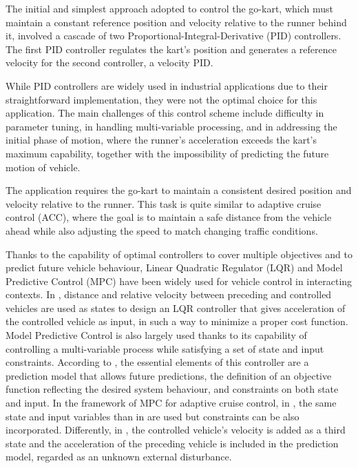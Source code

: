 \documentclass[a4paper,12pt,oneside]{book}
\begin{document}
\bigskip
The initial and simplest approach adopted to control the go-kart, which must maintain a constant reference position and velocity relative to the runner behind it, involved a cascade of two Proportional-Integral-Derivative (PID) controllers.
The first PID controller regulates the kart's position and generates a reference velocity for the second controller, a velocity PID.

While PID controllers are widely used in industrial applications due to their straightforward implementation, they were not the optimal choice for this application.
The main challenges of this control scheme include difficulty in parameter tuning, in handling multi-variable processing, and in addressing the initial phase of motion, where the runner's acceleration exceeds the kart's maximum capability, together with the impossibility of predicting the future motion of vehicle. 

\bigskip
The application requires the go-kart to maintain a consistent desired position and velocity relative to the runner.
This task is quite similar to adaptive cruise control (ACC), where the goal is to maintain a safe distance from the vehicle ahead while also adjusting the speed to match changing traffic conditions.

\bigskip
Thanks to the capability of optimal controllers to cover multiple objectives and to predict future vehicle behaviour, Linear Quadratic Regulator (LQR) and Model Predictive Control (MPC) have been widely used for vehicle control in interacting contexts.
In \cite{LQR_acc}, distance and relative velocity between preceding and controlled vehicles are used as states to design an LQR controller that gives acceleration of the controlled vehicle as input, in such a way to minimize a proper cost function.
Model Predictive Control is also largely used thanks to its capability of controlling a multi-variable process while satisfying a set of state and input constraints. 
According to \cite{MPC_basics}, the essential elements of this controller are a prediction model that allows future predictions, the definition of an objective function reflecting the desired system behaviour, and constraints on both state and input. 
In the framework of MPC for adaptive cruise control, in \cite{MPC_acc_first}, the same state and input variables than in \cite{LQR_acc} are used but constraints can be also incorporated. 
Differently, in \cite{MPC_acc_second}, the controlled vehicle's velocity is added as a third state and the acceleration of the preceding vehicle is included in the prediction model, regarded as an unknown external disturbance.
\end{document}
